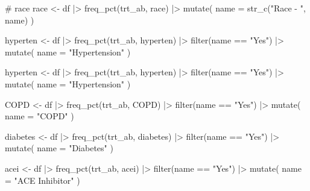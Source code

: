 \documentclass[
  letterpaper,
  DIV=11,
  numbers=noendperiod]{scrreprt}
\newenvironment{Shaded}{\begin{snugshade}}{\end{snugshade}}
\newcommand{\AttributeTok}[1]{\textcolor[rgb]{0.40,0.45,0.13}{#1}}
\newcommand{\CommentTok}[1]{\textcolor[rgb]{0.37,0.37,0.37}{#1}}
\newcommand{\FunctionTok}[1]{\textcolor[rgb]{0.28,0.35,0.67}{#1}}
\newcommand{\NormalTok}[1]{\textcolor[rgb]{0.00,0.23,0.31}{#1}}
\newcommand{\OtherTok}[1]{\textcolor[rgb]{0.00,0.23,0.31}{#1}}
\newcommand{\SpecialCharTok}[1]{\textcolor[rgb]{0.37,0.37,0.37}{#1}}
\newcommand{\StringTok}[1]{\textcolor[rgb]{0.13,0.47,0.30}{#1}}
\begin{document}
\begin{Shaded}
\begin{Highlighting}[]
\CommentTok{\# race}
\NormalTok{race }\OtherTok{\textless{}{-}}\NormalTok{ df }\SpecialCharTok{|\textgreater{}}
  \FunctionTok{freq\_pct}\NormalTok{(trt\_ab, race) }\SpecialCharTok{|\textgreater{}} 
  \FunctionTok{mutate}\NormalTok{(}
    \AttributeTok{name =} \FunctionTok{str\_c}\NormalTok{(}\StringTok{"Race {-} "}\NormalTok{, name)}
\NormalTok{  )}

\NormalTok{hyperten }\OtherTok{\textless{}{-}}\NormalTok{ df }\SpecialCharTok{|\textgreater{}}
  \FunctionTok{freq\_pct}\NormalTok{(trt\_ab, hyperten) }\SpecialCharTok{|\textgreater{}} 
  \FunctionTok{filter}\NormalTok{(name }\SpecialCharTok{==} \StringTok{"Yes"}\NormalTok{) }\SpecialCharTok{|\textgreater{}} 
  \FunctionTok{mutate}\NormalTok{(}
    \AttributeTok{name =} \StringTok{"Hypertension"}
\NormalTok{  )}

\NormalTok{hyperten }\OtherTok{\textless{}{-}}\NormalTok{ df }\SpecialCharTok{|\textgreater{}}
  \FunctionTok{freq\_pct}\NormalTok{(trt\_ab, hyperten) }\SpecialCharTok{|\textgreater{}} 
  \FunctionTok{filter}\NormalTok{(name }\SpecialCharTok{==} \StringTok{"Yes"}\NormalTok{) }\SpecialCharTok{|\textgreater{}} 
  \FunctionTok{mutate}\NormalTok{(}
    \AttributeTok{name =} \StringTok{"Hypertension"}
\NormalTok{  )}


\NormalTok{COPD }\OtherTok{\textless{}{-}}\NormalTok{ df }\SpecialCharTok{|\textgreater{}}
  \FunctionTok{freq\_pct}\NormalTok{(trt\_ab, COPD) }\SpecialCharTok{|\textgreater{}} 
  \FunctionTok{filter}\NormalTok{(name }\SpecialCharTok{==} \StringTok{"Yes"}\NormalTok{) }\SpecialCharTok{|\textgreater{}} 
  \FunctionTok{mutate}\NormalTok{(}
    \AttributeTok{name =} \StringTok{"COPD"}
\NormalTok{)  }

\NormalTok{diabetes }\OtherTok{\textless{}{-}}\NormalTok{ df }\SpecialCharTok{|\textgreater{}}
  \FunctionTok{freq\_pct}\NormalTok{(trt\_ab, diabetes) }\SpecialCharTok{|\textgreater{}} 
  \FunctionTok{filter}\NormalTok{(name }\SpecialCharTok{==} \StringTok{"Yes"}\NormalTok{) }\SpecialCharTok{|\textgreater{}} 
  \FunctionTok{mutate}\NormalTok{(}
    \AttributeTok{name =} \StringTok{"Diabetes"}
\NormalTok{  )  }

\NormalTok{acei }\OtherTok{\textless{}{-}}\NormalTok{ df }\SpecialCharTok{|\textgreater{}}
   \FunctionTok{freq\_pct}\NormalTok{(trt\_ab, acei) }\SpecialCharTok{|\textgreater{}} 
   \FunctionTok{filter}\NormalTok{(name }\SpecialCharTok{==} \StringTok{"Yes"}\NormalTok{) }\SpecialCharTok{|\textgreater{}} 
   \FunctionTok{mutate}\NormalTok{(}
     \AttributeTok{name =} \StringTok{"ACE Inhibitor"}
\NormalTok{   ) }
   

\end{Highlighting}
\end{Shaded}
\end{document}
